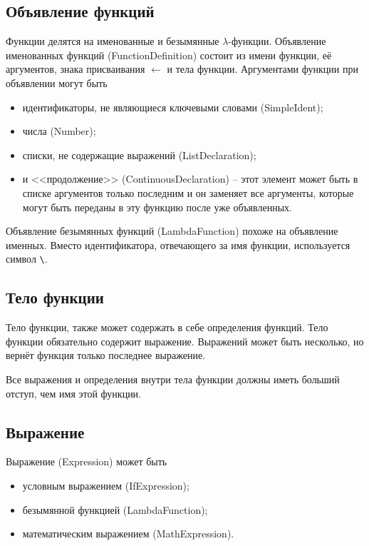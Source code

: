 \subsection{Объявление функций}
    Функции делятся на именованные и безымянные $\lambda$-функции.
    Объявление именованных функций (FunctionDefinition) состоит из имени функции, её аргументов, знака присваивания $\leftarrow$ и тела функции.
    Аргументами функции при объявлении могут быть 
    \begin{itemize}
        \item идентификаторы, не являющиеся ключевыми словами (SimpleIdent);
        \item числа (Number);
        \item списки, не содержащие выражений (ListDeclaration);
        \item и <<продолжение>> (ContinuousDeclaration) -- этот элемент может быть в списке аргументов только последним и он заменяет все аргументы, которые могут быть переданы в эту функцию после уже объявленных.
    \end{itemize}
    
    

    Объявление безымянных функций (LambdaFunction) похоже на объявление именных.
    Вместо идентификатора, отвечающего за имя функции, используется символ \verb,\,.

    

\subsection{Тело функции}
    Тело функции, также может содержать в себе определения функций.
    Тело функции обязательно содержит выражение.
    Выражений может быть несколько, но вернёт функция только последнее выражение.

    Все выражения и определения внутри тела функции должны иметь больший отступ, чем имя этой функции.

    

\subsection{Выражение}
    Выражение (Expression) может быть
    \begin{itemize}
        \item условным выражением (IfExpression);
        \item безымянной функцией (LambdaFunction);
        \item математическим выражением (MathExpression).
    \end{itemize}

